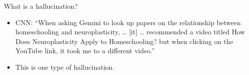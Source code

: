 \documentclass[11pt,compress,t,notes=noshow, xcolor=table]{beamer}
\begin{document}

\begin{vbframe}{What is a hallucination?}

\vfill


	\begin{itemize}

\item
CNN: ``When asking Gemini to look up papers on the relationship
between homeschooling and neuroplasticity, \ldots
[it] \ldots
recommended a video titled How Does
Neuroplasticity Apply to Homeschooling? but when clicking on
the YouTube link, it took me to a different video.''

\item This is one type of hallucination.
\end{itemize}

\vfill

\end{vbframe}
\end{document}
